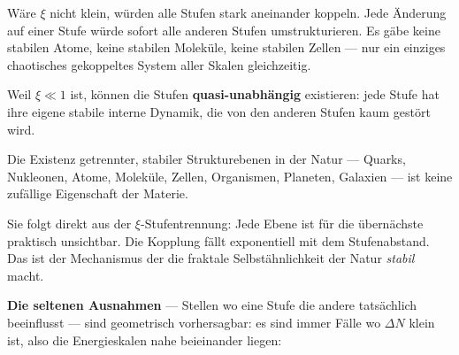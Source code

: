 Wäre $\xi$ nicht klein, würden alle Stufen
stark aneinander koppeln.
Jede Änderung auf einer Stufe würde sofort
alle anderen Stufen umstrukturieren.
Es gäbe keine stabilen Atome, keine stabilen Moleküle,
keine stabilen Zellen --- nur ein einziges
chaotisches gekoppeltes System aller Skalen gleichzeitig.

Weil $\xi \ll 1$ ist, können die Stufen
\textbf{quasi-unabhängig} existieren:
jede Stufe hat ihre eigene stabile interne Dynamik,
die von den anderen Stufen kaum gestört wird.

\begin{foundation}
Die Existenz getrennter, stabiler Strukturebenen
in der Natur --- Quarks, Nukleonen, Atome,
Moleküle, Zellen, Organismen, Planeten, Galaxien ---
ist keine zufällige Eigenschaft der Materie.

Sie folgt direkt aus der $\xi$-Stufentrennung:
Jede Ebene ist für die übernächste praktisch unsichtbar.
Die Kopplung fällt exponentiell mit dem Stufenabstand.
Das ist der Mechanismus der die fraktale
Selbstähnlichkeit der Natur \emph{stabil} macht.

\textbf{Die seltenen Ausnahmen} --- Stellen wo eine Stufe
die andere tatsächlich beeinflusst ---
sind geometrisch vorhersagbar:
es sind immer Fälle wo $\Delta N$ klein ist,
also die Energieskalen nahe beieinander liegen:

\begin{center}
\end{center}
\end{foundation}

